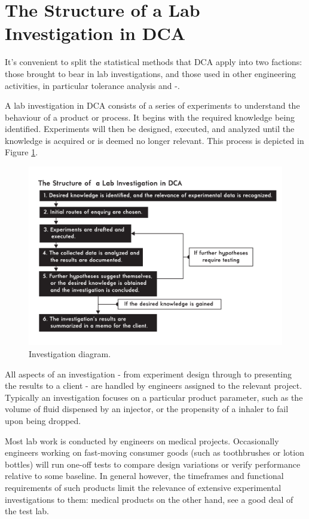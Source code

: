 \documentclass[11pt,a4paper,article]{memoir} %
\newlength\drop
\begin{document}
\section{The Structure of a Lab Investigation in DCA}
It's convenient to split the statistical methods that DCA apply into two factions: those brought to bear in lab investigations, and those used in other engineering activities, in particular tolerance analysis and -.
\par
A lab investigation in DCA consists of a series of experiments to understand the behaviour of a product or process. It begins with the required knowledge being identified. Experiments will then be designed, executed, and analyzed until the knowledge is acquired or is deemed no longer relevant. This process is depicted in Figure \ref{fig:investigation_diagram}.
\begin{figure}[h!]
\centering
\includegraphics[width=1.2\textwidth]{Lab_Investigation_Diagram.pdf}
\caption{Investigation diagram.}
\label{fig:investigation_diagram}
\end{figure}
All aspects of an investigation - from experiment design through to presenting the results to a client - are handled by engineers assigned to the relevant project. Typically an investigation focuses on a particular product parameter, such as the volume of fluid dispensed by an injector, or the propensity of a inhaler to fail upon being dropped. 
\par
Most lab work is conducted by engineers on medical projects.
Occasionally engineers working on fast-moving consumer goods (such as toothbrushes or lotion bottles) will run one-off tests to compare design variations or verify performance relative to some baseline. In general however, the timeframes and functional requirements of such products limit the relevance of extensive experimental investigations to them: medical products on the other hand, see a good deal of the test lab.
\end{document}
